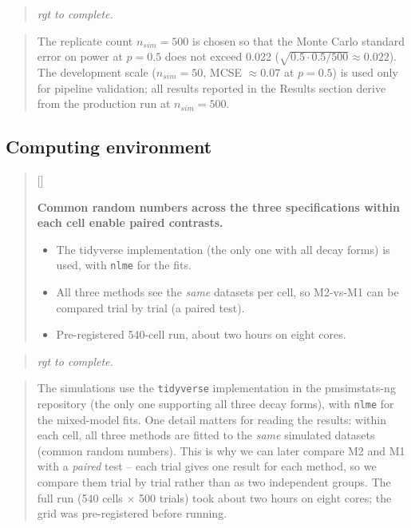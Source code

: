 \documentclass[
  11pt,
]{article}
\newcounter{pgraph}
\newenvironment{bullets}{%
  \stepcounter{pgraph}%
  \begin{quote}\small\sffamily\color[gray]{0.30}%
  {\normalfont\scriptsize\color[gray]{0.58}[\thepgraph]\enspace}}{%
  \end{quote}}
\newenvironment{rgt}{%
  \begin{quote}\small\itshape\color[RGB]{20,60,160}}{%
  \end{quote}}
\newenvironment{orig}{%
  \begin{quote}\normalsize\color[gray]{0.55}}{%
  \end{quote}}
\begin{document}
\begin{rgt}
rgt to complete.

\end{rgt}

\begin{orig}
The replicate count \(n_{sim} = 500\) is chosen so that the Monte
Carlo standard error on power at \(p = 0.5\) does not exceed 0.022
(\(\sqrt{0.5 \cdot 0.5 / 500} \approx 0.022\)). The development
scale (\(n_{sim} = 50\), MCSE \(\approx 0.07\) at \(p = 0.5\)) is
used only for pipeline validation; all results reported in the
Results section derive from the production run at \(n_{sim} = 500\).

\end{orig}

\subsection{Computing environment}\label{computing-environment}

\begin{bullets}

\textbf{Common random numbers across the three specifications
within each cell enable paired contrasts.}

\begin{itemize}\setlength{\itemsep}{2pt}\setlength{\parskip}{0pt}
\item The tidyverse implementation (the only one with all decay
forms) is used, with \texttt{nlme} for the fits.
\item All three methods see the \emph{same} datasets per cell, so
M2-vs-M1 can be compared trial by trial (a paired test).
\item Pre-registered 540-cell run, about two hours on eight cores.
\end{itemize}

\end{bullets}

\begin{rgt}
rgt to complete.

\end{rgt}

\begin{orig}
The simulations use the \texttt{tidyverse} implementation in the
pmsimstats-ng repository (the only one supporting all three decay
forms), with \texttt{nlme} for the mixed-model fits. One detail matters
for reading the results: within each cell, all three methods are
fitted to the \emph{same} simulated datasets (common random numbers).
This is why we can later compare M2 and M1 with a \emph{paired} test --
each trial gives one result for each method, so we compare them
trial by trial rather than as two independent groups. The full run
(540 cells \(\times\) 500 trials) took about two hours on eight
cores; the grid was pre-registered before running.

\end{orig}
\end{document}
